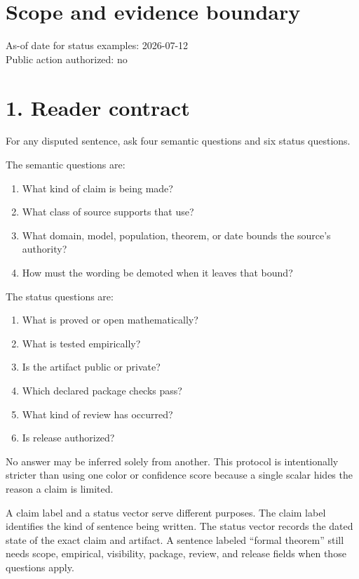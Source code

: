 \documentclass[
  american,
  11pt,
  letterpaper,
]{article}
\providecommand{\tightlist}{%
  \setlength{\itemsep}{0pt}\setlength{\parskip}{0pt}}
\begin{document}
\section{Scope and evidence boundary}\label{scope-and-evidence-boundary}

As-of date for status examples: 2026-07-12\\
Public action authorized: no

\section{1. Reader contract}\label{reader-contract}

For any disputed sentence, ask four semantic questions and six status questions.

The semantic questions are:

\begin{enumerate}
\def\labelenumi{\arabic{enumi}.}
\tightlist
\item
  What kind of claim is being made?
\item
  What class of source supports that use?
\item
  What domain, model, population, theorem, or date bounds the source's authority?
\item
  How must the wording be demoted when it leaves that bound?
\end{enumerate}

The status questions are:

\begin{enumerate}
\def\labelenumi{\arabic{enumi}.}
\tightlist
\item
  What is proved or open mathematically?
\item
  What is tested empirically?
\item
  Is the artifact public or private?
\item
  Which declared package checks pass?
\item
  What kind of review has occurred?
\item
  Is release authorized?
\end{enumerate}

No answer may be inferred solely from another. This protocol is intentionally stricter than using one color or confidence score because a single scalar hides the reason a claim is limited.

A claim label and a status vector serve different purposes. The claim label identifies the kind of sentence being written. The status vector records the dated state of the exact claim and artifact. A sentence labeled ``formal theorem'' still needs scope, empirical, visibility, package, review, and release fields when those questions apply.
\end{document}
